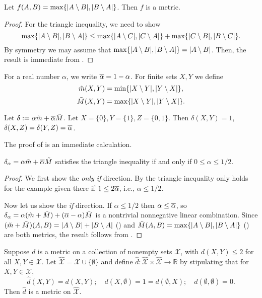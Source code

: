         \begin{lemma}\label{nid-numerator}
             Let $f(A,B)=\max\{\lvert A\setminus B\rvert,\lvert B\setminus A\rvert\}$. Then $f$ is a metric.
        \end{lemma}
        \begin{proof}
        For the triangle inequality, we need to show
			\[
			\max\{\lvert A\setminus B\rvert,\lvert B\setminus A\rvert\}
			\le
			\max\{\lvert A\setminus C\rvert,\lvert C\setminus A\rvert\}
			+
			\max\{\lvert C\setminus B\rvert,\lvert B\setminus C\rvert\}.
			\]
			By symmetry we may assume that $\max\{\lvert A\setminus B\rvert,\lvert B\setminus A\rvert\}=\lvert A\setminus B\rvert$. Then, the result is immediate from .            
        \end{proof}
		For a real number $\alpha$, we write $\overline{\alpha}=1-\alpha$.
		For finite sets $X,Y$ we define
		\[
			\tilde m(X,Y)=\min\{\lvert X\setminus Y\rvert, \lvert Y\setminus X\rvert\},
		\]
		\[
			\tilde M(X,Y)=\max\{\lvert X\setminus Y\rvert, \lvert Y\setminus X\rvert\}.
		\]
		\begin{lemma}\label{empathy}
			Let $\delta:=\alpha \tilde m +\overline{\alpha} \tilde M$. Let $X=\{0\}, Y=\{1\}, Z=\{0,1\}$. Then
			$\delta(X,Y)=1$, $\delta(X,Z)=\delta(Y,Z)=\overline{\alpha}$.
		\end{lemma}
		The proof of  is an immediate calculation.
		\begin{theorem}\label{may17}
			$\delta_{\alpha}=\alpha \tilde m +\overline{\alpha} \tilde M$ satisfies the triangle inequality  if and only if $0\le\alpha\le 1/2$.
		\end{theorem}
		\begin{proof}
			We first show the \emph{only if} direction. By  the triangle inequality only holds for the example given there if $1\le 2\overline{\alpha}$, i.e., $\alpha\le 1/2$.

			Now let us show the \emph{if} direction.
			If $\alpha\le 1/2$ then $\alpha\le\overline{\alpha}$, so $\delta_{\alpha}=\alpha (\tilde m + \tilde M) + (\overline{\alpha}-\alpha) \tilde M$ is a nontrivial nonnegative linear combination.
			Since $(\tilde m+\tilde M)(A,B)=\lvert A\setminus B\rvert+\lvert B\setminus A\rvert$ () and
			$\tilde M(A,B)=\max\{\lvert A\setminus B\rvert,\lvert B\setminus A\rvert\}$ () are both metrics, the result follows from .
		\end{proof}
		\begin{lemma}\label{to-motivate}
			Suppose $d$ is a metric on a collection of nonempty sets $\mathcal X$, with $d(X,Y)\le 2$ for all $X,Y\in\mathcal X$.
			Let $\hat{\mathcal X}=\mathcal X\cup\{\emptyset\}$ and define $\hat d:\hat{\mathcal X}\times\hat{\mathcal X}\to\mathbb R$ by
			stipulating that for $X,Y\in\mathcal X$,
			\[
				\hat d(X,Y)=d(X,Y);\quad
				d(X,\emptyset)=1=d(\emptyset,X);\quad
				d(\emptyset,\emptyset)=0.
			\]
			Then $\hat d$ is a metric on $\hat{\mathcal X}$.
		\end{lemma}
